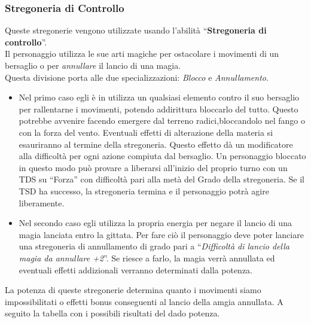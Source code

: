 \documentclass[../manuale_main.tex]{subfiles}
\begin{document}
\subsubsection{Stregoneria di Controllo}
Queste stregonerie vengono utilizzate usando l'abilità ``\textbf{Stregoneria di controllo}''.\\
Il personaggio utilizza le sue arti magiche per ostacolare i movimenti di un bersaglio o per \emph{annullare} il lancio di una magia. \\
Questa divisione porta alle due specializzazioni: \emph{Blocco} e \emph{Annullamento}.\\
\begin{itemize}
\item Nel primo caso egli è in utilizza un qualsiasi elemento contro il suo bersaglio per rallentarne i movimenti, potendo addirittura bloccarlo del tutto. Questo potrebbe avvenire facendo emergere dal terreno radici,bloccandolo nel fango o con la forza del vento. Eventuali effetti di alterazione della materia si esauriranno al termine della stregoneria. Questo effetto dà un modificatore alla difficoltà per ogni azione compiuta dal bersaglio. Un personaggio bloccato in questo modo può provare a liberarsi all'inizio del proprio turno con un TDS su ``Forza'' con difficoltà pari alla metà del Grado della stregoneria. Se il TSD ha successo, la stregoneria termina e il personaggio potrà agire liberamente.
\item Nel secondo caso egli utilizza la propria energia per negare il lancio di una magia lanciata entro la gittata. Per fare ciò il personaggio deve poter lanciare una stregoneria di annullamento di grado pari a ``\emph{Difficoltà di lancio della magia da annullare +2}''. Se riesce a farlo, la magia verrà annullata ed eventuali effetti addizionali verranno determinati dalla potenza.
\end{itemize}
La potenza di queste stregonerie determina quanto i movimenti siamo impossibilitati o effetti bonus conseguenti al lancio della amgia annullata. A seguito la tabella con i possibili risultati del dado potenza.\\
\end{document}
